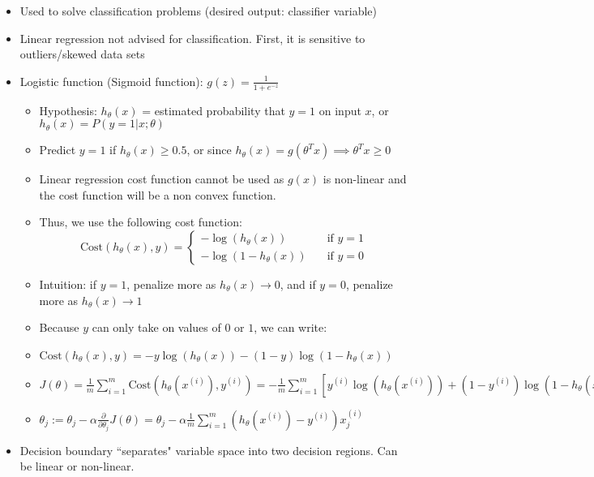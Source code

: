 \documentclass[letterpaper,10pt]{article}
\begin{document}
\begin{itemize}
\item Used to solve classification problems (desired output: classifier variable)
\item Linear regression not advised for classification. First, it is sensitive to outliers/skewed data sets
\item Logistic function (Sigmoid function): $g(z) = \frac{1}{1+e^{-z}}$
	
	\begin{itemize}
	\item Hypothesis: $h_{\theta}(x)$ = estimated probability that $y=1$ on input $x$, or $h_{\theta}(x) = P(y=1|x;\theta)$
	\item Predict $y=1$ if $h_{\theta}(x) \geq 0.5$, or since $h_{\theta}(x) = g(\theta^T x) \implies \theta^Tx \geq 0$
	\item Linear regression cost function cannot be used as $g(x)$ is non-linear and the cost function will be a non convex function.
	\item Thus, we use the following cost function:
	$$
	\text{Cost}\left( h_{\theta}(x),y \right) = \left\{
     	\begin{array}{lr}
       	-\log\left(h_{\theta}(x) \right) & \quad \text{if  } y=1\\
       	-\log\left( 1 - h_{\theta}(x) \right) & \quad \text{if  } y=0
     	\end{array}
   	\right.
	$$
	\item Intuition: if $y=1$, penalize more as $h_{\theta}(x) \rightarrow 0$, and if $y=0$, penalize more as $h_{\theta}(x) \rightarrow 1$
	\item Because $y$ can only take on values of $0$ or $1$, we can write:
	\item $\text{Cost}\left( h_{\theta}(x),y \right) = -y\log\left(h_{\theta}(x) \right) - (1-y)\log\left(1 - h_{\theta}(x) \right) $
	\item $J(\theta) = \frac{1}{m} \sum_{i=1}^m \text{Cost}\left( h_{\theta}(x^{(i)}),y^{(i)} \right) = -  \frac{1}{m} \sum_{i=1}^m \left[ y^{(i)}\log\left(h_{\theta}(x^{(i)}) \right) + (1-y^{(i)})\log\left(1 - h_{\theta}(x^{(i)}) \right) \right]$
	\item $\theta_j := \theta_j - \alpha \frac{\partial}{\partial \theta_j} J(\theta) = \theta_j - \alpha \frac{1}{m} \sum_{i=1}^m \left( h_{\theta}(x^{(i)}) - y^{(i)}  \right) x_j^{(i)}$
	\end{itemize}
\item Decision boundary ``separates" variable space into two decision regions. Can be linear or non-linear.


\end{itemize}
\end{document}
